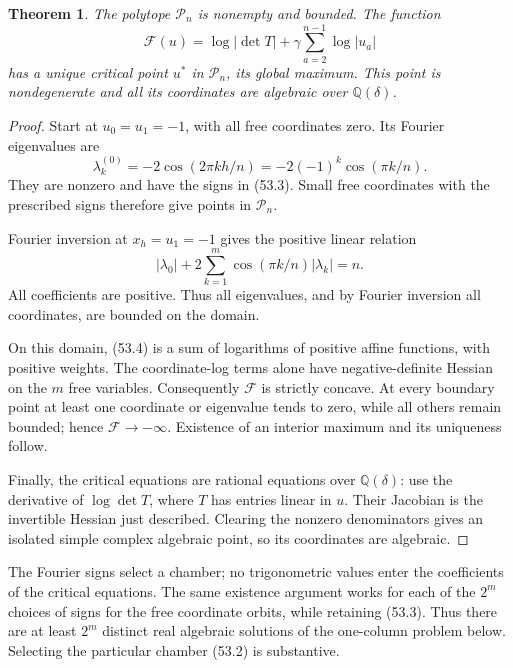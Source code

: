 \documentclass[11pt,reqno]{amsart}
\theoremstyle{plain}
\newtheorem{theorem}{Theorem}[section]
\begin{document}
\begin{theorem}
The polytope \(\mathcal P_n\) is nonempty and bounded.
The function
\begin{equation*}
 \boxed{\displaystyle
 \mathcal F(u)=\log|\det T|
             +\gamma\sum_{a=2}^{n-1}\log|u_a|
 }\tag{53.4}
\end{equation*}
has a unique critical point \(u^*\) in \(\mathcal P_n\), its global
maximum. This point is nondegenerate and all its coordinates are
algebraic over \(\mathbb Q(\delta)\).
\end{theorem}

\begin{proof}
Start at \(u_0=u_1=-1\), with all free coordinates zero.
Its Fourier eigenvalues are
\[
 \lambda_k^{(0)}=-2\cos(2\pi kh/n)
 =-2(-1)^k\cos(\pi k/n).
\]
They are nonzero and have the signs in (53.3). Small free coordinates
with the prescribed signs therefore give points in \(\mathcal P_n\).

Fourier inversion at \(x_h=u_1=-1\) gives the positive linear relation
\begin{equation*}
 |\lambda_0|+
 2\sum_{k=1}^{m}\cos(\pi k/n)|\lambda_k|=n.
 \tag{53.5}
\end{equation*}
All coefficients are positive. Thus all eigenvalues, and by Fourier
inversion all coordinates, are bounded on the domain.

On this domain, (53.4) is a sum of logarithms of positive affine
functions, with positive weights. The coordinate-log terms alone
have negative-definite Hessian on the \(m\) free variables.
Consequently \(\mathcal F\) is strictly concave. At every boundary
point at least one coordinate or eigenvalue tends to zero, while all
others remain bounded; hence \(\mathcal F\to-\infty\).
Existence of an interior maximum and its uniqueness follow.

Finally, the critical equations are rational equations over
\(\mathbb Q(\delta)\): use the derivative of \(\log\det T\), where
\(T\) has entries linear in \(u\). Their Jacobian is the invertible
Hessian just described. Clearing the nonzero denominators gives an
isolated simple complex algebraic point, so its coordinates are
algebraic.
\end{proof}

The Fourier signs select a chamber; no trigonometric values enter the
coefficients of the critical equations. The same existence argument
works for each of the \(2^m\) choices of signs for the free coordinate
orbits, while retaining (53.3). Thus there are at least \(2^m\)
distinct real algebraic solutions of the one-column problem below.
Selecting the particular chamber (53.2) is substantive.
\end{document}
